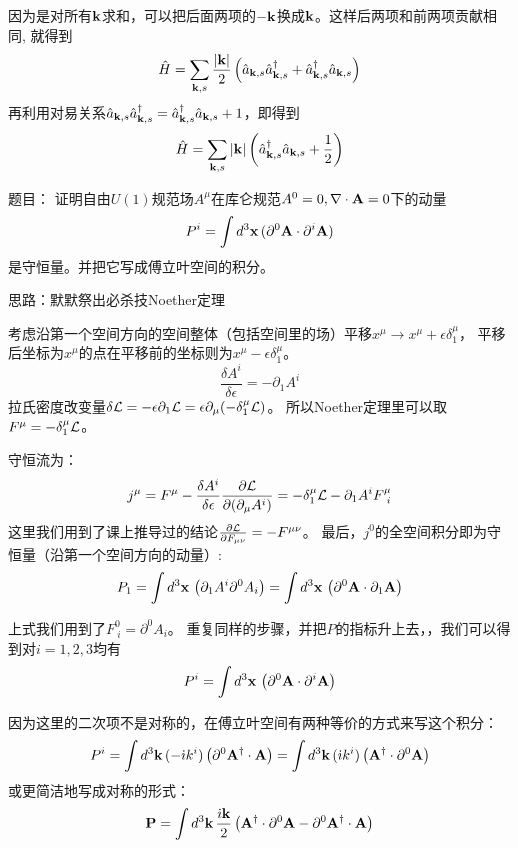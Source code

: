 \documentclass[CJK]{beamer}
\begin{document}
\begin{frame}
\bch

因为是对所有${\mathbf{k}}$求和，可以把后面两项的$-{\mathbf{k}}$换成${\mathbf{k}}$。这样后两项和前两项贡献相同, 就得到
$$\hat{H} = \sum_{{\mathbf{k}},s} \frac{|{\mathbf{k}}|}{2}\left({\hat{a}}_{{\mathbf{k}},s}{\hat{a}^\dagger}_{{\mathbf{k}},s}  + {\hat{a}^\dagger}_{{\mathbf{k}},s}{\hat{a}}_{{\mathbf{k}},s}\right)$$
再利用对易关系${\hat{a}}_{{\mathbf{k}},s}{\hat{a}^\dagger}_{{\mathbf{k}},s}  = {\hat{a}^\dagger}_{{\mathbf{k}},s}{\hat{a}}_{{\mathbf{k}},s} + 1$，即得到
$$\hat{H} = \sum_{{\mathbf{k}},s} |{\mathbf{k}}|\left({\hat{a}^\dagger}_{{\mathbf{k}},s}{\hat{a}}_{{\mathbf{k}},s}+\frac{1}{2}\right)$$



\ech
\end{frame}


\begin{frame}
\bch
题目：{\small
证明自由$U(1)$规范场$A^\mu$在库仑规范$A^0=0, \nabla\cdot {\mathbf{A}}=0$下的动量
$$P^i = \int d^3{\mathbf{x}}\, (\partial^0{\mathbf{A}} \cdot \partial^i{\mathbf{A}})$$
是守恒量。并把它写成傅立叶空间的积分。
}

\skipline
\skipline
思路：默默祭出必杀技Noether定理
\ech
\end{frame}

\begin{frame}
\bch
考虑沿第一个空间方向的空间整体（包括空间里的场）平移$x^\mu \rightarrow x^\mu+\epsilon \delta^\mu_1$，
平移后坐标为$x^\mu$的点在平移前的坐标则为$x^\mu-\epsilon \delta^\mu_1$。
$$\frac{\delta A^i}{\delta \epsilon} = -  \partial_1 A^i$$
拉氏密度改变量$\delta {\mathcal{L}} = -  \epsilon \partial_1 {\mathcal{L}} = \epsilon \partial_\mu(-\delta^\mu_1 {\mathcal{L}})$。
所以Noether定理里可以取$F^\mu = -\delta^\mu_1{\mathcal{L}}$。

守恒流为：
$$j^\mu = F^\mu - \frac{\delta A^i}{\delta \epsilon}\frac{\partial{\mathcal{L}}}{\partial(\partial_\mu A^i)} =  -\delta^\mu_1{\mathcal{L}} -  \partial_1 A^i F^\mu_{\ i} $$
这里我们用到了课上推导过的结论$\frac{\partial {\mathcal{L}}}{\partial F_{\mu\nu}} = - F^{\mu\nu}$。
最后，$j^0$的全空间积分即为守恒量（沿第一个空间方向的动量）:
$$P_1 = \int d^3{\mathbf{x}}\, \left(\partial_1 A^i \partial^0 A_i\right)=\int d^3{\mathbf{x}}\, \left( \partial^0 {\mathbf{A}}\cdot \partial_1 {\mathbf{A}} \right)$$
\ech
\end{frame}


\begin{frame}
\bch
上式我们用到了$F^0_{\ i} = \partial^0 A_i$。
重复同样的步骤，并把$P$的指标升上去，，我们可以得到对$i =1,2,3$均有
$$P^i = \int d^3{\mathbf{x}}\, \left(\partial^0 {\mathbf{A}}\cdot \partial^i {\mathbf{A}} \right)$$

因为这里的二次项不是对称的，在傅立叶空间有两种等价的方式来写这个积分：
$$P^i = \int d^3{\mathbf{k}}\, (-{\dot{\imath}} k^i) \left(\partial^0 {\mathbf{A}}^\dagger  \cdot {\mathbf{A}} \right)=\int d^3{\mathbf{k}}\, ({\dot{\imath}} k^i) \left( {\mathbf{A}}^\dagger  \cdot \partial^0 {\mathbf{A}} \right)$$
或更简洁地写成对称的形式：
$$\mathbf{P} = \int d^3{\mathbf{k}} \, \frac{{\dot{\imath}}{\mathbf{k}}}{2}\left( {\mathbf{A}}^\dagger  \cdot \partial^0{\mathbf{A}}-\partial^0 {\mathbf{A}}^\dagger  \cdot {\mathbf{A}} \right)$$
\ech
\end{frame}
\end{document}
